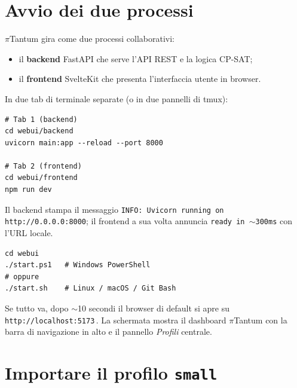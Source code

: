 \section{Avvio dei due processi}


$\pi$Tantum gira come due processi collaborativi:

\begin{itemize}
\item il \textbf{backend} FastAPI che serve l'API REST e la logica
  CP-SAT;
\item il \textbf{frontend} SvelteKit che presenta l'interfaccia
  utente in browser.
\end{itemize}

In due tab di terminale separate (o in due pannelli di tmux):

\begin{lstlisting}[style=shell]
# Tab 1 (backend)
cd webui/backend
uvicorn main:app --reload --port 8000

# Tab 2 (frontend)
cd webui/frontend
npm run dev
\end{lstlisting}

Il backend stampa il messaggio
\texttt{INFO: Uvicorn running on http://0.0.0.0:8000}; il
frontend a sua volta annuncia
\texttt{ready in $\sim$300ms} con l'URL locale.


\begin{esempiobox}[title=Provalo subito]
\begin{lstlisting}[style=shell]
cd webui
./start.ps1   # Windows PowerShell
# oppure
./start.sh    # Linux / macOS / Git Bash
\end{lstlisting}
Se tutto va, dopo $\sim$10 secondi il browser di default
si apre su \texttt{http://localhost:5173}\,. La schermata
mostra il dashboard $\pi$Tantum con la barra di navigazione
in alto e il pannello \emph{Profili} centrale.
\end{esempiobox}

\section{Importare il profilo \texttt{small}}

